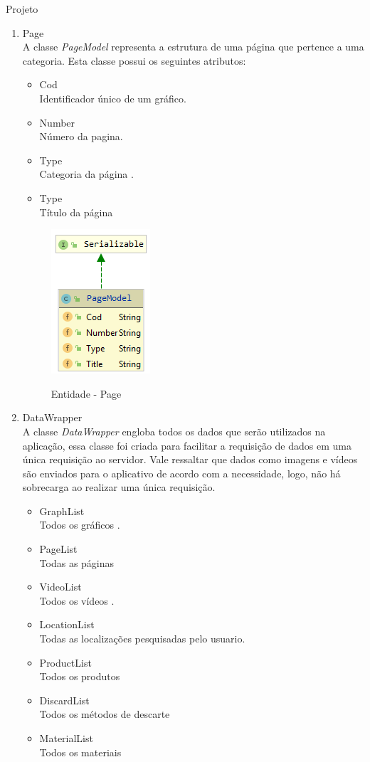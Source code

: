 \documentclass[
	12pt,				%
	openright,			%
	twoside,			%
	a4paper,			%
	english,			%
	french,				%
	spanish,			%
	brazil				%
	]{abntex2}
\begin{document}
\begin{chapter}{Projeto}
\begin{enumerate}
  \item{Page}   \\ A classe \textit{PageModel} representa a estrutura de uma página que pertence a uma categoria. Esta classe possui os seguintes atributos:
  \begin{itemize}
  \item{Cod}\\ Identificador único de um gráfico.
       \item{Number}\\Número da pagina.
         \item{Type}\\ Categoria da página
         . \item{Type}\\ Título da página
\end{itemize}
\begin{figure}[h]
\centering
   \caption{Entidade - Page}
   \includegraphics[scale=1.0]{media/PageModel.png}
     \label{fig:pageModel}
\end{figure}

\newpage
\item{DataWrapper}   \\ A classe \textit{DataWrapper} engloba todos os dados que serão utilizados na aplicação, essa classe foi criada para facilitar a requisição de dados em uma única requisição ao servidor. Vale ressaltar que dados como imagens e vídeos são enviados para o aplicativo de acordo com a necessidade, logo, não há sobrecarga ao realizar uma única requisição.
\newline
  \begin{itemize}
  \item{GraphList}\\ Todos os gráficos .
       \item{PageList}\\  Todas as páginas 
         \item{VideoList}\\ Todos os vídeos
         . \item{LocationList}\\ Todas as localizações pesquisadas pelo usuario.
         \item{ProductList}\\  Todos os produtos
         \item{DiscardList}\\ Todos os métodos de descarte 
         \item{MaterialList}\\  Todos os materiais
         

\end{itemize}
\end{enumerate}
\end{chapter}
\end{document}
